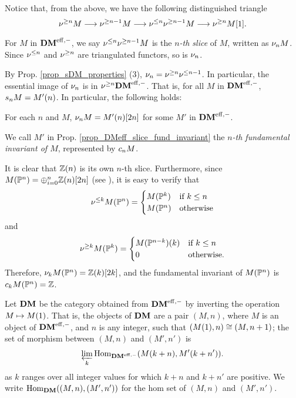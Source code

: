 Notice that, from the above, we have the following distinguished
triangle
\begin{equation}
\sgDM{n} M \to \sgDM{n - 1} M \to \slDM{n} \sgDM{n - 1} M
\to \sgDM{n} M[1].
\end{equation}

\begin{defn}
For $M$ in $\DMeff$, we say $\slDM{n}\sgDM{n - 1}M$ is the 
\emph{$n$-th slice} of $M$, written as $\sliceDM{n}M$. Since
$\slDM{n}$ and $\sgDM{n}$ are triangulated functors, so is 
$\sliceDM{n}$.
\end{defn}

By Prop. \ref{prop_sDM_properties} (3), $\sliceDM{n} =
\sgDM{n}\slDM{n - 1}$. In particular, the essential image of
$\sliceDM{n}$ is in $\sgDM{n}\DMeff$. That is, for all $M$ in 
$\DMeff$, $\slice{n}M = \tZ[n]{M'}$. In particular, the following
holds:

\begin{prop}\label{prop_DMeff_slice_fund_invariant}
For each $n$ and $M$, $\sliceDM{n}M = M'(n)[2n]$ for some $M'$ in
$\DMeff$.
\end{prop}

\begin{defn}\label{def_fI_DMeff}
We call $M'$ in Prop. \ref{prop_DMeff_slice_fund_invariant} the 
\emph{$n$-th fundamental invariant of $M$}, represented by
$\fIDM{n}M$.
\end{defn}

\begin{ex}\label{ex_sfilt_MPn}
It is clear that $\Z(n)$ is its own $n$-th slice. Furthermore,
since $M(\P^n) = \oplus_{i = 0}^n \Z(n)[2n]$ (see 
\cite[15.5]{MVW}), it is easy to verify that 
\[
\slDM{k}M(\P^n) = \begin{cases}
M(\P^k) & \textrm{if }k \leq n \\
M(\P^n) & \textrm{otherwise}
\end{cases}
\]
and 
\[
\sgDM{k}M(\P^k) = \begin{cases}
\tZ[k]{M(\P^{n - k})} & \textrm{if }k \leq n\\
0 & \textrm{otherwise}.
\end{cases}
\]
Therefore, $\sliceDM{k} M(\P^n) = \Z(k)[2k]$, and the 
fundamental invariant of $M(\P^n)$ is $\fIDM{k}M(\P^n) = \Z$.
\end{ex}

\begin{defn}
Let $\DM$ be the category obtained from $\DMeff$ by inverting
the operation $M \mapsto \tZ{M}$. That is, the objects of $\DM$
are a pair $(M, n)$, where $M$ is an object of $\DMeff$, and $n$
is any integer, such that $(\tZ{M}, n) \cong (M, n + 1)$; the set 
of morphism between $(M, n)$ and $(M', n')$ is 
\[
\varprojlim_{k} \homDMf(\tZ[k + n]{M}, \tZ[k + n']{M'}).
\]
as $k$ ranges over all integer values for which $k + n$ and 
$k + n'$ are positive. We write $\homDM((M, n), (M',n'))$ for the 
hom set of $(M, n)$ and $(M', n')$. 
\end{defn}

